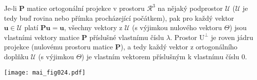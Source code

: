 \begin{mdframed}[style=mdexam]
  \begin{example}\label{mai:exam012}
    Je-li \(\mathbf{P}\) matice ortogonální projekce v prostoru \(\mathcal{R}^3\) na nějaký 
    podprostor \(\mathcal{U}\) (\(\mathcal{U}\) je tedy buď rovina nebo přímka procházející 
    počátkem), pak pro každý vektor \(\mathbf{u}\in\mathcal{U}\) platí \(\mathbf{Pu} = 
    \mathbf{u}\), všechny vektory z \(\mathcal{U}\) (s výjimkou nulového vektoru \(\Theta\)) 
    jsou vlastními vektory matice $\mathbf{P}$ příslušné vlastnímu číslu \(\lambda\). Prostor 
    \(\mathrm{U}^\bot\) je roven jádru projekce (nulovému prostoru matice \(\mathbf{P}\)), 
    a tedy každý vektor z ortogonálního doplňku \(\mathcal{U}\) (s výjimkou \(\Theta\)) je 
    vlastním vektorem příslušným k vlastnímu číslu \(0\).

    {\centering
      \captionsetup{type=figure}
      \texttt{[image: mai\_fig024.pdf]}
      \label{MAI:FIG016}
      \par}
  \end{example}
\end{mdframed}